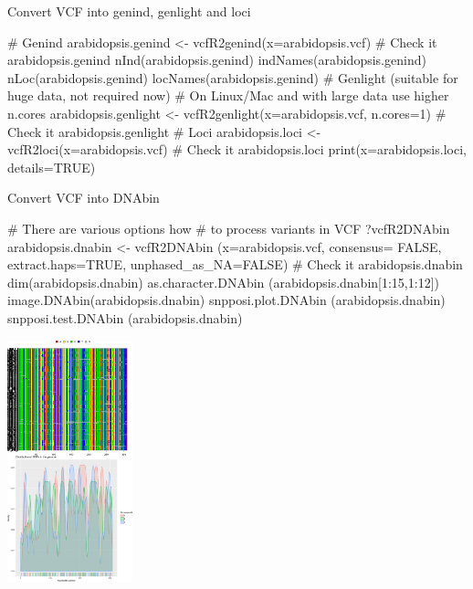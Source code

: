 \documentclass[compress, ucs, xelatex, 11pt, xcolor=svgnames,
  hyperref={
    bookmarks=true,
    unicode=true,
    colorlinks=true,
    pdftitle={Molecular data in R},
    plainpages=false,
    pdfauthor={Vojtech Zeisek},
    pdfsubject={Course about phylogeny and evolution in R},
    pdfcreator={XeLaTeX},
    pdfkeywords={R, evolution, phylogeny, molecular data},
    linkcolor=Tomato,
    anchorcolor=SaddleBrown,
    citecolor=Goldenrod,
    filecolor=DarkMagenta,
    menucolor=Sienna,
    urlcolor=DarkTurquoise,
    pdftex},
  url={hyphens, lowtilde} %
  ]{beamer}
\begin{document}
\begin{frame}[fragile]{Convert VCF into genind, genlight and loci}
  \begin{spluscode}
    # Genind
    arabidopsis.genind <- vcfR2genind(x=arabidopsis.vcf)
    # Check it
    arabidopsis.genind
    nInd(arabidopsis.genind)
    indNames(arabidopsis.genind)
    nLoc(arabidopsis.genind)
    locNames(arabidopsis.genind)
    # Genlight (suitable for huge data, not required now)
    # On Linux/Mac and with large data use higher n.cores
    arabidopsis.genlight <- vcfR2genlight(x=arabidopsis.vcf, n.cores=1)
    # Check it
    arabidopsis.genlight
    # Loci
    arabidopsis.loci <- vcfR2loci(x=arabidopsis.vcf)
    # Check it
    arabidopsis.loci
    print(x=arabidopsis.loci, details=TRUE)
  \end{spluscode}
\end{frame}

\begin{frame}[fragile]{Convert VCF into DNAbin}
  \begin{multicols}{2}
  \begin{spluscode}
    # There are various options how
    # to process variants in VCF
    ?vcfR2DNAbin
    arabidopsis.dnabin <- vcfR2DNAbin
      (x=arabidopsis.vcf, consensus=
      FALSE, extract.haps=TRUE,
      unphased_as_NA=FALSE)
    # Check it
    arabidopsis.dnabin
    dim(arabidopsis.dnabin)
    as.character.DNAbin
      (arabidopsis.dnabin[1:15,1:12])
    image.DNAbin(arabidopsis.dnabin)
    snpposi.plot.DNAbin
      (arabidopsis.dnabin)
    snpposi.test.DNAbin
      (arabidopsis.dnabin)
  \end{spluscode}
  \begin{center}
    \includegraphics[height=7cm]{vcf_dna.png}
  \end{center}
  \end{multicols}
\end{frame}
\end{document}
